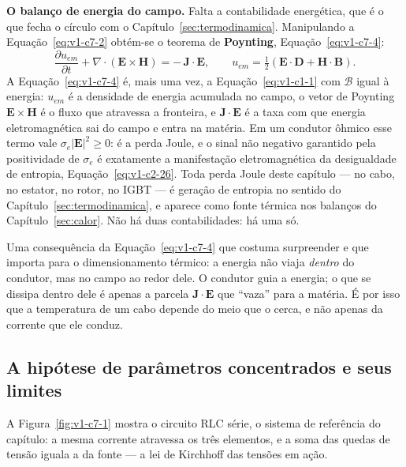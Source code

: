 \documentclass[12pt,a4paper]{article}
\numberwithin{equation}{section}
\numberwithin{table}{section}
\numberwithin{figure}{section}
\begin{document}
\textbf{O balanço de energia do campo.} Falta a contabilidade energética, que é
o que fecha o círculo com o Capítulo~\ref{sec:termodinamica}. Manipulando a
Equação~\eqref{eq:v1-c7-2} obtém-se o teorema de \textbf{Poynting},
Equação~\eqref{eq:v1-c7-4}:
\begin{equation}\label{eq:v1-c7-4}
\frac{\partial u_{em}}{\partial t} + \nabla\cdot(\mathbf{E}\times\mathbf{H})
= -\,\mathbf{J}\cdot\mathbf{E},
\qquad
u_{em} = \tfrac{1}{2}\left(\mathbf{E}\cdot\mathbf{D} +
\mathbf{H}\cdot\mathbf{B}\right).
\end{equation}
A Equação~\eqref{eq:v1-c7-4} é, mais uma vez, a Equação~\eqref{eq:v1-c1-1} com
$\mathcal{B}$ igual à energia: $u_{em}$ é a densidade de energia acumulada no
campo, o vetor de Poynting $\mathbf{E}\times\mathbf{H}$ é o fluxo que atravessa
a fronteira, e $\mathbf{J}\cdot\mathbf{E}$ é a taxa com que energia
eletromagnética sai do campo e entra na matéria. Em um condutor ôhmico esse
termo vale $\sigma_e|\mathbf{E}|^2 \geq 0$: é a perda Joule, e o sinal não
negativo garantido pela positividade de $\sigma_e$ é exatamente a
manifestação eletromagnética da desigualdade de entropia,
Equação~\eqref{eq:v1-c2-26}. Toda perda Joule deste capítulo --- no cabo, no
estator, no rotor, no IGBT --- é geração de entropia no sentido do
Capítulo~\ref{sec:termodinamica}, e aparece como fonte térmica nos balanços do
Capítulo~\ref{sec:calor}. Não há duas contabilidades: há uma só.

Uma consequência da Equação~\eqref{eq:v1-c7-4} que costuma surpreender e que
importa para o dimensionamento térmico: a energia não viaja \emph{dentro} do
condutor, mas no campo ao redor dele. O condutor guia a energia; o que se
dissipa dentro dele é apenas a parcela $\mathbf{J}\cdot\mathbf{E}$ que
``vaza'' para a matéria. É por isso que a temperatura de um cabo depende do
meio que o cerca, e não apenas da corrente que ele conduz.

\subsection{A hipótese de parâmetros concentrados e seus
limites}\label{sub:v1-c7-concentrados}

A Figura~\ref{fig:v1-c7-1} mostra o circuito RLC série, o sistema de
referência do capítulo: a mesma corrente atravessa os três elementos, e a
soma das quedas de tensão iguala a da fonte --- a lei de Kirchhoff das
tensões em ação.
\end{document}
